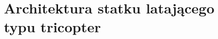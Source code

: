 \chapter{Architektura statku latającego typu tricopter}
\label{cha:architektura_statku_latajacego_typu_tricopter}